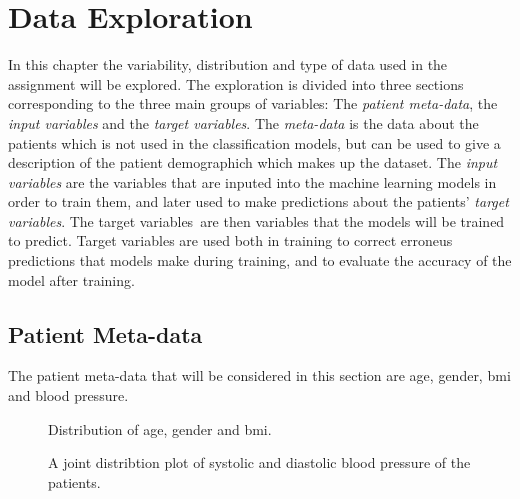 \chapter{Data Exploration} \label{chap:data}

In this chapter the variability, distribution and type of data used in the assignment will be explored. 
The exploration is divided into three sections corresponding to the three main groups of variables: 
The \textit{patient meta-data}, the \textit{input variables} and the \textit{target variables}. 
The \textit{meta-data} is the data about the patients which is not used in the classification models, 
but can be used to give a description of the patient demographich which makes up the dataset. 
The \textit{input variables} are the variables that are inputed into the machine learning models in order to train them, 
and later used to make predictions about the patients' \textit{target variables}. 
The target variables are then variables that the models will be trained to predict. 
Target variables are used both in training to correct erroneus predictions that models make during training, and to evaluate the accuracy of the model after training. \bigskip

\section{Patient Meta-data} \label{sec:metadata}
The patient meta-data that will be considered in this section are age, gender, \acrfull{bmi} and blood pressure.

\begin{figure}
    \centering
    
    \caption{Distribution of age, gender and \acrshort{bmi}.}
    \label{fig:meta_dist4}
\end{figure}

\begin{figure}
    \centering
    
    \caption{A joint distribtion plot of systolic and diastolic blood pressure of the patients.}
    \label{fig:bp_dist}
\end{figure}

